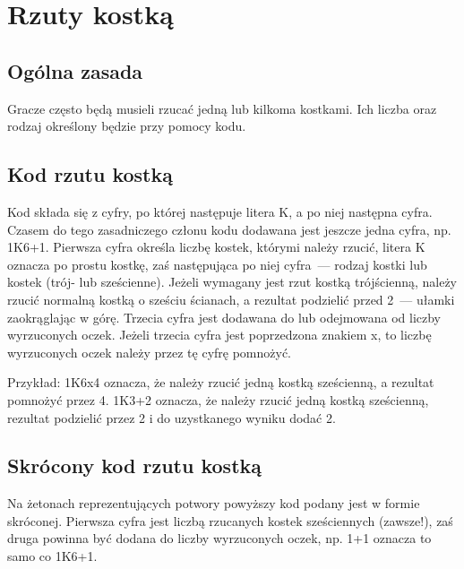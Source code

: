 \section{Rzuty kostką}
\subsection{Ogólna zasada}
Gracze często będą musieli rzucać jedną lub kilkoma kostkami. Ich liczba oraz rodzaj określony będzie przy pomocy kodu.

\subsection{Kod rzutu kostką}
Kod składa się z cyfry, po której następuje litera K, a po niej następna cyfra.
Czasem do tego zasadniczego członu kodu dodawana jest jeszcze jedna cyfra, np. 1K6+1.
Pierwsza cyfra określa liczbę kostek, którymi należy rzucić, litera K oznacza po prostu kostkę, zaś następująca po niej cyfra~--- rodzaj kostki lub kostek (trój- lub sześcienne).
Jeżeli wymagany jest rzut kostką trójścienną, należy rzucić normalną kostką o sześciu ścianach, a rezultat podzielić przed 2~--- ułamki zaokrąglając w górę.
Trzecia cyfra jest dodawana do lub odejmowana od liczby wyrzuconych oczek.
Jeżeli trzecia cyfra jest poprzedzona znakiem x, to liczbę wyrzuconych oczek należy przez tę cyfrę pomnożyć.

Przykład: 1K6x4 oznacza, że należy rzucić jedną kostką sześcienną, a rezultat pomnożyć przez 4.
1K3+2 oznacza, że należy rzucić jedną kostką sześcienną, rezultat podzielić przez 2 i do uzystkanego wyniku dodać 2.

\subsection{Skrócony kod rzutu kostką}
Na żetonach reprezentujących potwory powyższy kod podany jest w formie skróconej. Pierwsza cyfra jest liczbą rzucanych kostek sześciennych (zawsze!), zaś druga powinna być dodana do liczby wyrzuconych oczek, np. 1+1 oznacza to samo co 1K6+1.
